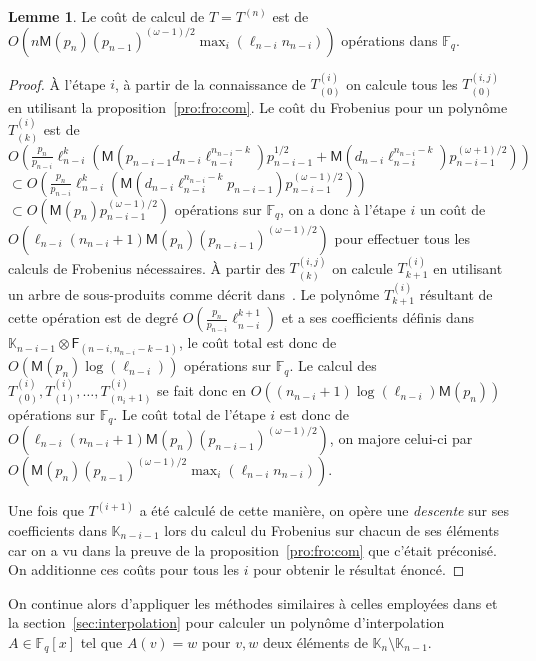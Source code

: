 \documentclass[10pt,a4paper]{book}
\theoremstyle{plain}
\theoremstyle{definition}
\newtheorem{lem}[thm]{Lemme}
\theoremstyle{definition}
\theoremstyle{definition}
\theoremstyle{definition}
\theoremstyle{remark}
\theoremstyle{remark}
\theoremstyle{definition}
\begin{document}
\begin{lem}\label{lem:interpolation:minpoly:ult}
  Le coût de calcul de $T=T^{(n)}$ est de 
  $O(n\mathsf{M}(p_n)(p_{n-1})^{(\omega-1)/2} \max_i(\ell_{n-i}n_{n-i}))$
  opérations dans $\mathbb{F}_q$.
\end{lem}

\begin{proof}
  \`A l'étape $i$, à partir de la connaissance de $T^{(i)}_{(0)}$ on  calcule tous 
  les $T^{(i,j)}_{(0)}$ en utilisant la proposition~\ref{pro:fro:com}. Le coût du 
  Frobenius pour un polynôme $T^{(i)}_{(k)}$ est de 
  $O(\frac{p_n}{p_{n-i}}\ell_{n-i}^{k}(\mathsf{M}(p_{n-i-1}d_{n-i}\ell_{n-i}^{n_{n-i}-k})p_{n-i-1}^{1/2}+\mathsf{M}(d_{n-i}\ell_{n-i}^{n_{n-i}-k})p_{n-i-1}^{(\omega+1)/2}))$ 
  $\subset O(\frac{p_n}{p_{n-i}}\ell_{n-i}^{k}(\mathsf{M}(d_{n-i}\ell_{n-i}^{n_{n-i}-k}p_{n-i-1})p_{n-i-1}^{(\omega-1)/2}))$ 
  $\subset O(\mathsf{M}(p_n)p_{n-i-1}^{(\omega - 1)/2})$ opérations sur 
  $\mathbb{F}_q$, on a donc à l'étape $i$ un coût de $O(\ell_{n-i}(n_{n-i}+1)\mathsf{M}(p_n)(p_{n-i-1})^{(\omega - 1)/2})$ 
  pour effectuer tous les calculs de Frobenius nécessaires.
  \`A partir des $T^{(i,j)}_{(k)}$ on calcule $T^{(i)}_{k+1}$ en utilisant un arbre de 
  sous-produits comme décrit dans~\cite[Lemma~10.4]{vzGJG03}. Le polynôme 
  $T^{(i)}_{k+1}$ résultant de cette opération est de degré 
  $O(\frac{p_n}{p_{n-i}}\ell_{n-i}^{k+1})$ et a ses 
  coefficients définis dans $\mathbb{K}_{n-i-1} \otimes \mathsf{F}_{(n-i,n_{n-i}-k-1)}$,
  le coût total est donc de 
  $O(\mathsf{M}(p_n)\log(\ell_{n-i}))$ opérations sur $\mathbb{F}_q$. 
  Le calcul des $T^{(i)}_{(0)},T^{(i)}_{(1)}, \dots, T^{(i)}_{(n_i+1)}$ se fait
  donc en $O((n_{n-i}+1) \log(\ell_{n-i})\mathsf{M}(p_n))$ opérations sur 
  $\mathbb{F}_{q}$.
  Le coût total de l'étape $i$ est donc de 
  $O(\ell_{n-i}(n_{n-i}+1)\mathsf{M}(p_n)(p_{n-i-1})^{(\omega-1)/2})$,
  on majore celui-ci par 
  $O(\mathsf{M}(p_n)(p_{n-1})^{(\omega-1)/2} \max_i(\ell_{n-i}n_{n-i}))$.
  
  Une fois que $T^{(i+1)}$ a été calculé de cette manière, on opère une 
  \emph{descente} sur ses coefficients dans $\mathbb{K}_{n-i-1}$ lors du calcul
  du Frobenius sur chacun de ses éléments car on a vu dans la preuve de la 
  proposition~\ref{pro:fro:com} que c'était préconisé.
  On additionne ces coûts pour tous les $i$ pour obtenir le résultat 
  énoncé. 
\end{proof}
 
 On continue alors d'appliquer les méthodes similaires à celles employées dans 
 \cite{DeFeo10} et la section~\ref{sec:interpolation} pour calculer un polynôme 
 d'interpolation $A \in \mathbb{F}_q[x]$ tel que $A(v)=w$ pour $v,w$ deux 
 éléments de $\mathbb{K}_{n} \setminus \mathbb{K}_{n-1}$.
 
\end{document}

